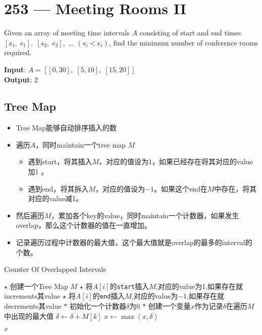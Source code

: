 \section{253 --- Meeting Rooms II}
Given an array of meeting time intervals $A$ consisting of start and end times $[s_1,\;e_1],\;[s_2,\;e_2],\;\ldots$ $(s_i < e_i)$, find the minimum number of conference rooms required.
\par
\begin{flushleft}
\textbf{Input}: $A =[[0, 30],\;[5, 10],\;[15, 20]]$
\\
\textbf{Output}: 2
\end{flushleft}
\subsection{Tree Map}
\begin{itemize}
\item Tree Map能够自动排序插入的数
\item 遍历$A$，同时maintain一个tree map $M$
\begin{itemize}
\item 遇到start，将其插入$M$，对应的值设为$1$，如果已经存在将其对应的value加1
。
\item 遇到end，将其拆入$M$，对应的值设为$-1$。如果这个end在$M$中存在，将其对应的value减1。
\end{itemize}
\item 然后遍历$M$，累加各个key的value，同时maintain一个计数器，如果发生overlap，那么这个计数器的值在一直增加。
\item 记录遍历过程中计数器的最大值，这个最大值就是overlap的最多的interval的个数。
\end{itemize}
\setcounter{algorithm}{0}
\begin{algorithm}[H]
\caption{Counter Of Overlapped Intervals}
\begin{algorithmic}[1]
\State $\star$ 创建一个Tree Map $M$
\State $\star$ 将$A[i]$的\texttt{start}插入$M$,对应的value为1,如果存在就increments其value
\State $\star$ 将$A[i]$的\texttt{end}插入$M$,对应的value为$-1$,如果存在就decrements其value
\EndFor
\State $\ast$ 初始化一个计数器$\delta$为0
\State $\ast$ 创建一个变量$x$作为记录$\delta$在遍历$M$中出现的最大值
\State $\delta\gets\delta+M[k]$
\State $x\gets\max(x, \delta)$
\EndFor
{}
\end{algorithmic}
\end{algorithm}
\begin{algorithm}[H]
\begin{algorithmic}[1]
\State \Return $x$
\EndProcedure
\end{algorithmic}
\end{algorithm}
